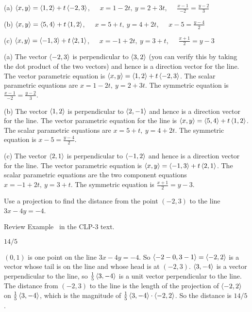 \begin{answer}
(a) $\left< x,y\right>=\left< 1,2\right>+t\left< -2,3\right> $,\ \ \ 
    $x=1-2t,\ y=2+3t$,\ \ \ 
    $\frac{x-1}{-2}=\frac{y-2}{3}$

(b) $\left< x,y\right>=\left< 5,4\right>+t\left< 1,2\right> $,\ \ \ 
    $x=5+t,\ y=4+2t$,\ \ \ 
    $x-5=\frac{y-4}{2}$

(c) $\left< x,y\right>=\left< -1,3\right>+t\left< 2,1\right> $,\ \ \ 
    $x=-1+2t,\ y=3+t$,\ \ \ 
    $\frac{x+1}{2}=y-3$
\end{answer}

\begin{solution}
(a) The vector $\left< -2,3\right> $ is perpendicular to $\left< 3,2\right> $ (you can
verify this by taking the dot product of the two vectors) and hence is 
a direction vector for the line.
The vector parametric equation is $\left< x,y\right>=\left< 1,2\right>+t\left< -2,3\right> $.
The scalar parametric equations are $x=1-2t,\ y=2+3t$.
The symmetric equation is $\frac{x-1}{-2}=\frac{y-2}{3}$.

(b) The vector $\left< 1,2\right> $ is perpendicular to $\left< 2,-1\right> $ 
 and hence is a direction vector for the line.
The vector parametric equation for the line is 
           $\left< x,y\right>=\left< 5,4\right>+t\left< 1,2\right> $.
The scalar parametric equations are $x=5+t,\ y=4+2t$.
The symmetric equation is $x-5=\frac{y-4}{2}$.

(c) The vector $\left< 2,1\right> $ is perpendicular to $\left< -1,2\right> $  
and hence is a direction vector for the line.
The vector parametric equation is $\left< x,y\right>=\left< -1,3\right>+t\left< 2,1\right> $.
The scalar parametric equations are the two component equations $x=-1+2t,\ y=3+t$.
The symmetric equation is $\frac{x+1}{2}=y-3$.
\end{solution}



\begin{question}
Use a projection to find the distance from the point $(-2,3)$
to the line $3x-4y=-4$.
\end{question}

\begin{hint}
Review Example~ in the CLP-3 text.%
\end{hint}

\begin{answer}
$14/5$
\end{answer}

\begin{solution}
$(0,1)$ is one point on the line $3x-4y=-4$. So $\left<-2-0,3-1\right>
=\left<-2,2\right>$ is a vector whose tail is on the line and whose 
head is at $(-2,3)$. $\left< 3,-4\right>$ is a vector perpendicular to the line,
so $\frac{1}{5}\left< 3,-4\right>$ is a unit vector perpendicular to the line.
The distance from $(-2,3)$ to the line is the length of the projection 
of $\left<-2,2\right>$ on $\frac{1}{5}\left< 3,-4\right>$, which is the magnitude of 
$\frac{1}{5}\left< 3,-4\right>\cdot\left< -2,2\right>$. So the distance is $14/5$.
\end{solution}



